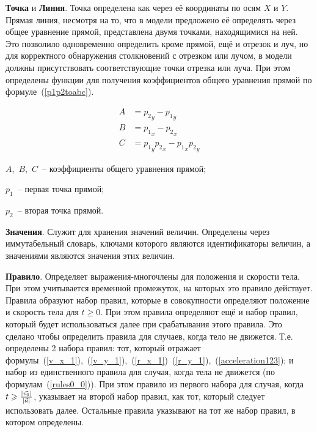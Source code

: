 \textbf{Точка} и \textbf{Линия}.\label{pointlinedescr} Точка определена как через её координаты по осям \(X\) и \(Y\).
Прямая линия, несмотря на то, что в модели предложено её определять через общее уравнение прямой, представлена двумя точками, находящимися на ней.
Это позволило одновременно определить кроме прямой, ещё и отрезок и луч, но для корректного обнаружения столкновений с отрезком или лучом,
в модели должны присутствовать соответствующие точки отрезка или луча.
При этом определены функции для получения коэффициентов общего уравнения прямой по формуле~(\ref{p1p2toabc}).

\begin{align}\label{p1p2toabc}
    A & = {p_2}_y - {p_1}_y \nonumber                  \\
    B & = {p_1}_x - {p_2}_x                            \\
    C & = {p_1}_y {p_2}_x - {p_1}_x {p_2}_y  \nonumber
\end{align}

\begin{Underequation}
    \(A\),~\(B\),~\(C\)~-- коэффициенты общего уравнения прямой;

    \(p_1\)~-- первая точка прямой;

    \(p_2\)~-- вторая точка прямой.
\end{Underequation}

\textbf{Значения}.\label{valuesdescr}
Служит для хранения значений величин. Определены через иммутабельный словарь, ключами которого являются
идентификаторы величин, а значениями являются значения этих величин.

\textbf{Правило}.\label{rulesdescr}
Определяет выражения-многочлены для положения и скорости тела.
При этом учитывается временной промежуток, на которых это правило действует. Правила образуют набор правил,
которые в совокупности определяют положение и скорость тела для \(t \geqslant 0\). При этом правила определяют
ещё и набор правил, который будет использоваться далее при срабатывания этого правила.
Это сделано чтобы определить правила для случаев, когда тело не движется. Т.е. определены 2 набора правил:
тот, который отражает формулы~(\ref{v_x_1}),~(\ref{v_y_1}),~(\ref{r_x_1})~(\ref{r_y_1}),~(\ref{acceleration123});
и набор из единственного правила для случая, когда тела не движется (по формулам~(\ref{rules0_0})).
При этом правило из первого набора для случая, когда \(t \geqslant \frac{\left|\vec{v_0}\right|}{\left|\vec{a}\right|}\),
указывает на второй набор правил, как тот, который следует использовать далее.
Остальные правила указывают на тот же набор правил, в котором определены.

